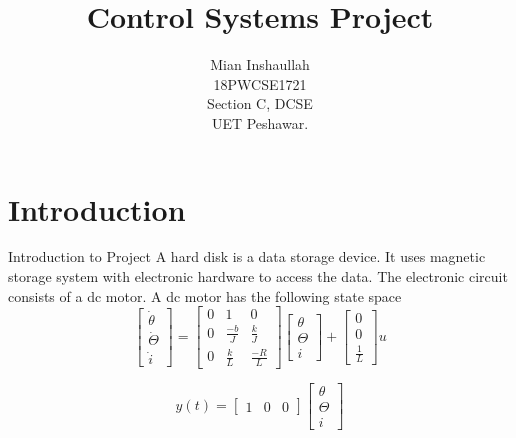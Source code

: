 \documentclass[10pt,compress,mathserif]{beamer}
\title[]{Control Systems Project}
\author[]{Mian Inshaullah \\18PWCSE1721 \\ Section C, DCSE \\ UET Peshawar.}
\begin{document}
\begin{frame}    \titlepage \end{frame}

\section{Introduction}
\begin{frame}{Introduction to Project}
\noindent A hard disk is a data storage device. It uses magnetic storage system with electronic hardware to access the data. The electronic circuit consists of a dc motor. A dc motor has the following state space\\ \vskip10pt
\begin{equation}
\begin{bmatrix} \dot{\theta}\\  \dot{\Theta} \\ \dot{i}\end{bmatrix}
= \begin{bmatrix}
0 & 1 & 0 \\
0 & \frac{-b}{J} & \frac{k}{J} \\
0 & \frac{k}{L} & \frac{-R}{L}  \end{bmatrix}
\begin{bmatrix} \theta\\  \Theta \\ i \end{bmatrix} +
\begin{bmatrix}
0 \\
0 \\
\frac{1}{L}  \end{bmatrix}
 u 
\end{equation}\vskip10pt

\begin{equation}
y(t)=\begin{bmatrix}
1 & 0 & 0
\end{bmatrix}
\begin{bmatrix} \theta \\  \Theta \\ i \end{bmatrix}
\end{equation}
\end{frame}
\end{document}
